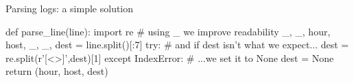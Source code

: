 \begin{frame}[fragile]{Parsing logs: a simple solution}
\begin{pythoncode}
def parse_line(line):
    import re
    # using _ we improve readability
    _, _, hour, host, _, _, dest = line.split()[:7]
    try:
        # and if dest isn't what we expect...
        dest = re.split(r'[<>]',dest)[1]
    except IndexError:
        # ...we set it to None
        dest = None
    return (hour, host, dest)
\end{pythoncode}
\end{frame}
